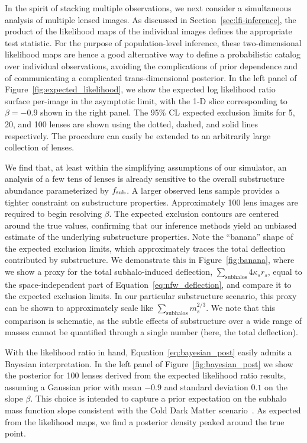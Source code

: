 \documentclass[twocolumn]{aastex63}
\begin{document}
In the spirit of stacking multiple observations, we next consider a simultaneous analysis of multiple lensed images. As discussed in Section~\ref{sec:lfi-inference}, the product of the likelihood maps of the individual images defines the appropriate test statistic. For the purpose of population-level inference, these two-dimensional likelihood maps are hence a good alternative way to define a probabilistic catalog over individual observations, avoiding the complications of prior dependence and of communicating a complicated trans-dimensional posterior. In the left panel of Figure~\ref{fig:expected_likelihood}, we show the expected log likelihood ratio surface per-image in the asymptotic limit, with the 1-D slice corresponding to $\beta = -0.9$ shown in the right panel. The 95\% CL expected exclusion limits for 5, 20, and 100 lenses are shown using the dotted, dashed, and solid lines respectively. The procedure can easily be extended to an arbitrarily large collection of lenses.

We find that, at least within the simplifying assumptions of our simulator, an analysis of a few tens of lenses is already sensitive to the overall substructure abundance parameterized by $f_{\mathrm{sub}}$. A larger observed lens sample provides a tighter constraint on substructure properties. Approximately 100 lens images are required to begin resolving $\beta$. The expected exclusion contours are centered around the true values, confirming that our inference methods yield an unbiased estimate of the underlying substructure properties. Note the ``banana'' shape of the expected exclusion limits, which approximately traces the total deflection contributed by substructure. We demonstrate this in Figure~\ref{fig:banana}, where we show a proxy for the total subhalo-induced deflection, $\sum_{\text{subhalos}} 4 \kappa_s r_s$, equal to the space-independent part of Equation~\eqref{eq:nfw_deflection}, and compare it to the expected exclusion limits. In our particular substructure scenario, this proxy can be shown to approximately scale like $\sum_{\text{subhalos}} m_s^{2/3}$. We note that this comparison is schematic, as the subtle effects of substructure over a wide range of masses cannot be quantified through a single number (here, the total deflection).

With the likelihood ratio in hand, Equation~\eqref{eq:bayesian_post} easily admits a Bayesian interpretation. In the left panel of Figure~\ref{fig:bayesian_post} we show the posterior for 100 lenses derived from the expected likelihood ratio results, assuming a Gaussian prior with mean $-0.9$ and standard deviation $0.1$ on the slope $\beta$. This choice is intended to capture a prior expectation on the subhalo mass function slope consistent with the Cold Dark Matter scenario~\citep[\eg,][]{0802.2265,0809.0898}. As expected from the likelihood maps, we find a posterior density peaked around the true point.
\end{document}

